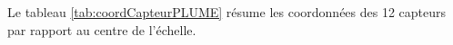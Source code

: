     \medskip
%     
%     
%     
%     
%     
%     
%     
%     

   Le tableau \ref{tab:coordCapteurPLUME} r\'esume les coordonn\'ees des 12 capteurs par rapport au centre de l'\'echelle.
    
    \medskip
    

